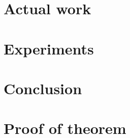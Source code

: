 \documentclass{thesisreport}
\begin{document}
 
 \chapter{Actual work}
  
 

 
 \chapter{Experiments}
 
 
 \chapter*{Conclusion}
 
 
 
 
 
 \appendix	
 
 \chapter{Proof of theorem}
 
 
 
 
 
 
 
\end{document}
